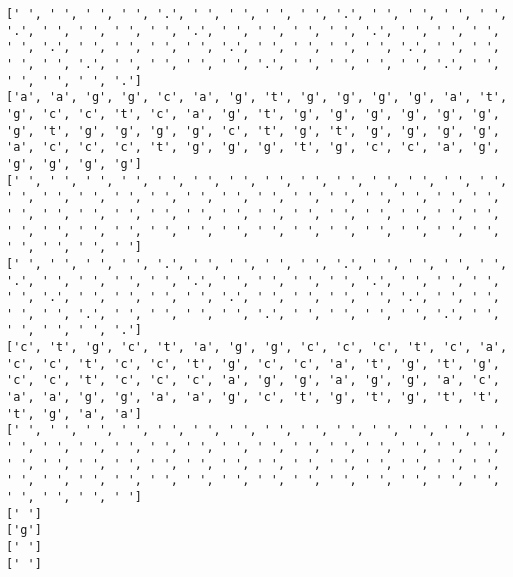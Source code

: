 \documentclass{article}
\begin{document}
\begin{Verbatim}
[' ', ' ', ' ', ' ', '.', ' ', ' ', ' ', ' ', '.', ' ', ' ', ' ', ' ', '.', ' ', ' ', ' ', ' ', '.', ' ', ' ', ' ', ' ', '.', ' ', ' ', ' ', ' ', '.', ' ', ' ', ' ', ' ', '.', ' ', ' ', ' ', ' ', '.', ' ', ' ', ' ', ' ', '.', ' ', ' ', ' ', ' ', '.', ' ', ' ', ' ', ' ', '.', ' ', ' ', ' ', ' ', '.']
['a', 'a', 'g', 'g', 'c', 'a', 'g', 't', 'g', 'g', 'g', 'g', 'a', 't', 'g', 'c', 'c', 't', 'c', 'a', 'g', 't', 'g', 'g', 'g', 'g', 'g', 'g', 'g', 't', 'g', 'g', 'g', 'g', 'c', 't', 'g', 't', 'g', 'g', 'g', 'g', 'a', 'c', 'c', 'c', 't', 'g', 'g', 'g', 't', 'g', 'c', 'c', 'a', 'g', 'g', 'g', 'g', 'g']
[' ', ' ', ' ', ' ', ' ', ' ', ' ', ' ', ' ', ' ', ' ', ' ', ' ', ' ', ' ', ' ', ' ', ' ', ' ', ' ', ' ', ' ', ' ', ' ', ' ', ' ', ' ', ' ', ' ', ' ', ' ', ' ', ' ', ' ', ' ', ' ', ' ', ' ', ' ', ' ', ' ', ' ', ' ', ' ', ' ', ' ', ' ', ' ', ' ', ' ', ' ', ' ', ' ', ' ', ' ', ' ', ' ', ' ', ' ', ' ']
[' ', ' ', ' ', ' ', '.', ' ', ' ', ' ', ' ', '.', ' ', ' ', ' ', ' ', '.', ' ', ' ', ' ', ' ', '.', ' ', ' ', ' ', ' ', '.', ' ', ' ', ' ', ' ', '.', ' ', ' ', ' ', ' ', '.', ' ', ' ', ' ', ' ', '.', ' ', ' ', ' ', ' ', '.', ' ', ' ', ' ', ' ', '.', ' ', ' ', ' ', ' ', '.', ' ', ' ', ' ', ' ', '.']
['c', 't', 'g', 'c', 't', 'a', 'g', 'g', 'c', 'c', 'c', 't', 'c', 'a', 'c', 'c', 't', 'c', 'c', 't', 'g', 'c', 'c', 'a', 't', 'g', 't', 'g', 'c', 'c', 't', 'c', 'c', 'c', 'a', 'g', 'g', 'a', 'g', 'g', 'a', 'c', 'a', 'a', 'g', 'g', 'a', 'a', 'g', 'c', 't', 'g', 't', 'g', 't', 't', 't', 'g', 'a', 'a']
[' ', ' ', ' ', ' ', ' ', ' ', ' ', ' ', ' ', ' ', ' ', ' ', ' ', ' ', ' ', ' ', ' ', ' ', ' ', ' ', ' ', ' ', ' ', ' ', ' ', ' ', ' ', ' ', ' ', ' ', ' ', ' ', ' ', ' ', ' ', ' ', ' ', ' ', ' ', ' ', ' ', ' ', ' ', ' ', ' ', ' ', ' ', ' ', ' ', ' ', ' ', ' ', ' ', ' ', ' ', ' ', ' ', ' ', ' ', ' ']
[' ']
['g']
[' ']
[' ']
 

\end{Verbatim}
\end{document}
